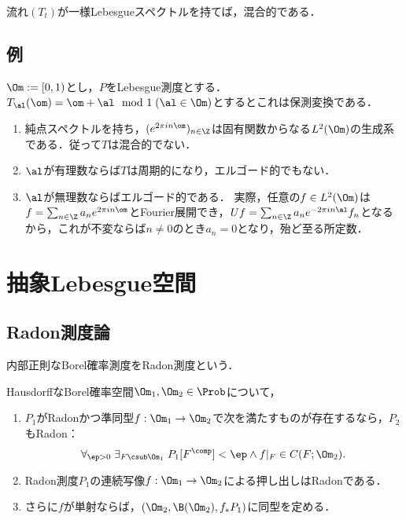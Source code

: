 \documentclass[uplatex,dvipdfmx]{jsreport}
\begin{document}
\begin{corollary}
    流れ$(T_t)$が一様Lebesgueスペクトルを持てば，混合的である．
\end{corollary}

\subsection{例}

\begin{example}
    $\Om:=[0,1)$とし，$P$をLebesgue測度とする．$T_\al(\om)=\om+\al\mod 1\;(\al\in\Om)$とするとこれは保測変換である．
    \begin{enumerate}
        \item 純点スペクトルを持ち，$(e^{2\pi in\om})_{n\in\Z}$は固有関数からなる$L^2(\Om)$の生成系である．従って$T$は混合的でない．
        \item $\al$が有理数ならば$T$は周期的になり，エルゴード的でもない．
        \item $\al$が無理数ならばエルゴード的である．
        実際，任意の$f\in L^2(\Om)$は$f=\sum_{n\in\Z}a_ne^{2\pi in\om}$とFourier展開でき，$Uf=\sum_{n\in\Z}a_ne^{-2\pi in\al}f_n$となるから，これが不変ならば$n\ne0$のとき$a_n=0$となり，殆ど至る所定数．
    \end{enumerate}
\end{example}

\section{抽象Lebesgue空間}

\subsection{Radon測度論}

\begin{tcolorbox}[colframe=ForestGreen, colback=ForestGreen!10!white,breakable,colbacktitle=ForestGreen!40!white,coltitle=black,fonttitle=\bfseries\sffamily,
title=]
    内部正則なBorel確率測度をRadon測度という．
\end{tcolorbox}

\begin{lemma}
    HausdorffなBorel確率空間$\Om_1,\Om_2\in\Prob$について，
    \begin{enumerate}
        \item $P_1$がRadonかつ準同型$f:\Om_1\to\Om_2$で次を満たすものが存在するなら，$P_2$もRadon：
        \[\forall_{\ep>0}\;\exists_{F\csub\Om_1}\;P_1[F^\comp]<\ep\land f|_F\in C(F;\Om_2).\]
        \item Radon測度$P_1$の連続写像$f:\Om_1\to\Om_2$による押し出しはRadonである．
        \item さらに$f$が単射ならば，$(\Om_2,\B(\Om_2),f_*P_1)$に同型を定める．
    \end{enumerate}
\end{lemma}
\end{document}
